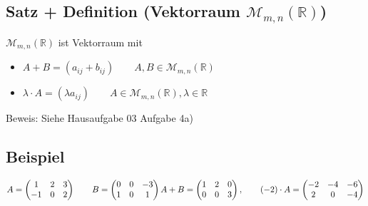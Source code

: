 \documentclass[a4paper, 12pt,titlepage, pdf, headsepline]{scrartcl}
\newcommand{\R}{\mathds{R}}
\newcommand{\M}{\mathcal{M}}
\renewcommand{\>}{\rightarrow}
\renewcommand{\*}{\cdot}
\begin{document}
\subsection{Satz + Definition (Vektorraum $\M_{m,n}(\R)$)}
$\mathcal{M}_{m,n}(\R)$ ist Vektorraum mit 
\begin{itemize}
	\item $A + B = (a_{ij} + b_{ij}) \qquad A,B \in \mathcal{M}_{m,n}(\R)$
	\item $\lambda \cdot A = (\lambda a_{ij})\qquad A \in \mathcal{M}_{m,n}(\R), \lambda \in \R$
\end{itemize}
Beweis: Siehe Hausaufgabe 03 Aufgabe 4a)
\subsection{Beispiel}
$A = \begin{pmatrix}
1 & 2 & 3 \\
-1 & 0 & 2 \\
\end{pmatrix}\qquad B = \begin{pmatrix}
0& 0& -3 \\
1&0&1 \\
\end{pmatrix} \\
A + B = \begin{pmatrix}
1 & 2 & 0 \\
0 & 0 & 3 \\
\end{pmatrix}, \qquad (-2) \cdot A = \begin{pmatrix}
-2 & -4 & -6 \\
2 & 0 & -4 \\
\end{pmatrix}$
\end{document}
